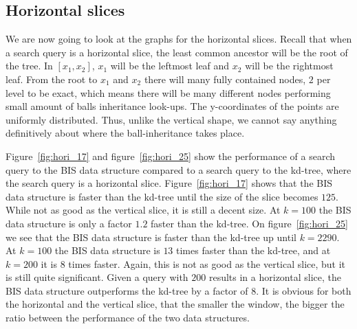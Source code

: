 \subsection{Horizontal slices}

We are now going to look at the graphs for the horizontal slices. Recall that when a search query is a horizontal slice, the least common ancestor will be the root of the tree. In $[x_1, x_2]$, $x_1$ will be the leftmost leaf and $x_2$ will be the rightmost leaf. From the root to $x_1$ and $x_2$ there will many fully contained nodes, $2$ per level to be exact, which means there will be many different nodes performing small amount of balls inheritance look-ups. The y-coordinates of the points are uniformly distributed. Thus, unlike the vertical shape, we cannot say anything definitively about where the ball-inheritance takes place. 

Figure~\ref{fig:hori_17} and figure~\ref{fig:hori_25} show the performance of a search query to the BIS data structure compared to a search query to the kd-tree, where the search query is a horizontal slice. Figure~\ref{fig:hori_17} shows that the BIS data structure is faster than the kd-tree until the size of the slice becomes $125$. While not as good as the vertical slice, it is still a decent size. At $k = 100$ the BIS data structure is only a factor $1.2$ faster than the kd-tree. On figure~\ref{fig:hori_25} we see that the BIS data structure is faster than the kd-tree up until $k = 2290$. At $k = 100$ the BIS data structure is $13$ times faster than the kd-tree, and at $k = 200$ it is $8$ times faster. Again, this is not as good as the vertical slice, but it is still quite significant. Given a query with $200$ results in a horizontal slice, the BIS data structure outperforms the kd-tree by a factor of $8$. It is obvious for both the horizontal and the vertical slice, that the smaller the window, the bigger the ratio between the performance of the two data structures.


